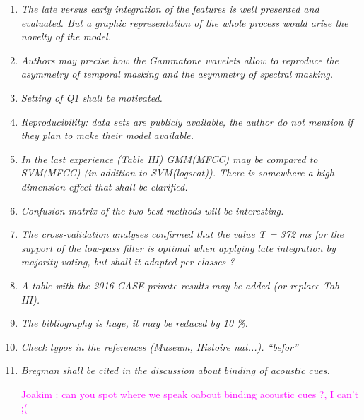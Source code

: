 \documentclass[10pt]{article}
\newcommand{\ja}[1]{\textcolor{magenta}{Joakim : #1}}
\begin{document}
\begin{enumerate}

\item \emph{The late versus early integration of the features is well presented and evaluated. But a graphic representation of the whole process would arise the novelty of the model.}

\item \emph{Authors may precise  how the Gammatone wavelets allow
to reproduce the asymmetry of temporal masking and the asymmetry of spectral masking.}

\item \emph{Setting of Q1 shall be motivated.}

\item \emph{Reproducibility:  data sets are publicly available, the author do not mention if they plan to make their model available.}

\item \emph{In the last experience (Table III) GMM(MFCC) may be compared to SVM(MFCC) (in addition to SVM(logscat)). There is somewhere a high dimension effect that shall be clarified.}

\item \emph{Confusion matrix of the two best methods will be interesting.}

\item \emph{The cross-validation analyses confirmed that the value T = 372 ms for the support of the low-pass filter is optimal when applying late integration by majority voting, but shall it adapted per classes  ?}

\item \emph{A table with the 2016 CASE private results may be added (or replace Tab III).}

\item \emph{The bibliography is huge, it may be reduced by 10 \%.}

\item \emph{Check typos in the references (Museum, Histoire nat...). “befor”}

\item \emph{Bregman shall be cited in the discussion about  binding of acoustic cues.}

\ja{can you spot where we speak oabout binding acoustic cues ?, I can't ;(}

\end{enumerate}
\end{document}
